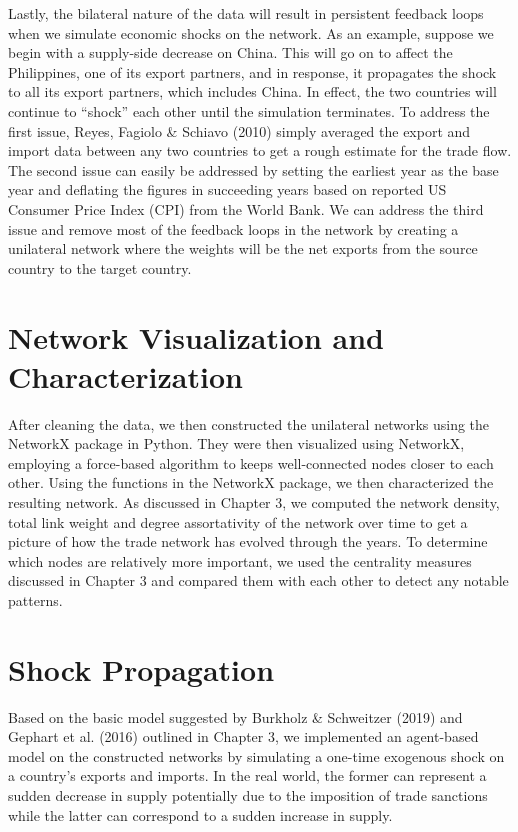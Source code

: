 \documentclass[12pt,letterpaper]{report}
\begin{document}
	Lastly, the bilateral nature of the data will result in persistent feedback loops when we simulate economic shocks on the network. As an example, suppose we begin with a supply-side decrease on China. This will go on to affect the Philippines, one of its export partners, and in response, it propagates the shock to all its export partners, which includes China. In effect, the two countries will continue to “shock” each other until the simulation terminates.
	To address the first issue, Reyes, Fagiolo \& Schiavo (2010) simply averaged the export and import data between any two countries to get a rough estimate for the trade flow. The second issue can easily be addressed by setting the earliest year as the base year and deflating the figures in succeeding years based on reported US Consumer Price Index (CPI) from the World Bank. We can address the third issue and remove most of the feedback loops in the network by creating a unilateral network where the weights will be the net exports from the source country to the target country.
	
	\section{Network Visualization and Characterization}
	\label{sec:42networkVisualizationCharacterization}
	
	After cleaning the data, we then constructed the unilateral networks using the NetworkX package in Python. They were then visualized using NetworkX, employing a force-based algorithm to keeps well-connected nodes closer to each other.
	Using the functions in the NetworkX package, we then characterized the resulting network. As discussed in Chapter 3, we computed the network density, total link weight and degree assortativity of the network over time to get a picture of how the trade network has evolved through the years. To determine which nodes are relatively more important, we used the centrality measures discussed in Chapter 3 and compared them with each other to detect any notable patterns.
	
	\section{Shock Propagation}
	\label{sec:43shockPropagation}

	Based on the basic model suggested by Burkholz \& Schweitzer (2019) and Gephart et al. (2016) outlined in Chapter 3, we implemented an agent-based model on the constructed networks by simulating a one-time exogenous shock on a country’s exports and imports. In the real world, the former can represent a sudden decrease in supply potentially due to the imposition of trade sanctions while the latter can correspond to a sudden increase in supply. 
	
\end{document}
